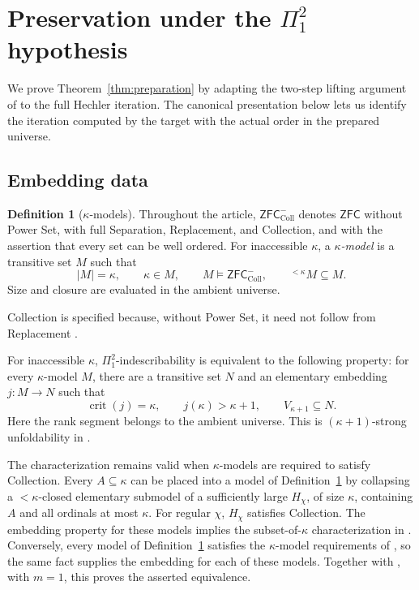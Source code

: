 \documentclass[10pt,a4paper]{amsart}
\theoremstyle{definition}
\newtheorem{definition}[theorem]{Definition}
\theoremstyle{remark}
\newcommand{\ZFC}{\mathsf{ZFC}}
\newcommand{\ZFCc}{\mathsf{ZFC}^{-}_{\mathrm{Coll}}}
\DeclareMathOperator{\crit}{crit}
\begin{document}
\appendix
\section{Preservation under the
  \texorpdfstring{\(\Pi^2_1\)}{Pi-2-1} hypothesis}
\label{sec:preservation}

We prove Theorem~\ref{thm:preparation} by adapting the two-step
lifting argument of \cite[pp.~1229--1232]{Johnstone} to the
full Hechler iteration. The canonical presentation below lets
us identify the iteration computed by the target with the
actual order in the prepared universe.

\subsection{Embedding data}

\begin{definition}[\(\kappa\)-models]\label{def:kappa-model}
Throughout the article, \(\ZFCc\) denotes \(\ZFC\) without
Power Set, with full Separation, Replacement, and Collection,
and with the assertion that every set can be well ordered.
For inaccessible \(\kappa\), a \emph{\(\kappa\)-model} is a
transitive set \(M\) such that
\[
 |M|=\kappa,\qquad \kappa\in M,\qquad M\models\ZFCc,
 \qquad {}^{<\kappa}M\subseteq M.
\]
Size and closure are evaluated in the ambient universe.
\end{definition}

Collection is specified because, without Power Set, it need
not follow from Replacement \cite{GHJ}.

For inaccessible \(\kappa\), \(\Pi^2_1\)-indescribability
is equivalent to the following property: for every
\(\kappa\)-model \(M\), there are a transitive set \(N\)
and an elementary embedding \(j:M\to N\) such that
\[
 \crit(j)=\kappa,\qquad j(\kappa)>\kappa+1,
 \qquad V_{\kappa+1}\subseteq N.
\]
Here the rank segment belongs to the ambient universe. This is
\((\kappa+1)\)-strong unfoldability in
\cite[Definition 3 and Corollary 35]{Johnstone}.

The characterization remains valid when \(\kappa\)-models
are required to satisfy Collection.
Every \(A\subseteq\kappa\) can be placed into a model of
Definition~\ref{def:kappa-model} by collapsing a
\(<\kappa\)-closed elementary submodel of a sufficiently
large \(H_\chi\), of size \(\kappa\), containing \(A\)
and all ordinals at most \(\kappa\). For regular \(\chi\),
\(H_\chi\) satisfies Collection. The embedding property for
these models implies the subset-of-\(\kappa\)
characterization in \cite[Fact 4(4)]{Johnstone}. Conversely,
every model of Definition~\ref{def:kappa-model} satisfies
the \(\kappa\)-model requirements of \cite{Johnstone}, so the same
fact supplies the embedding for each of these models.
Together with \cite[Corollary 35]{Johnstone}, with \(m=1\),
this proves the asserted equivalence.
\end{document}
